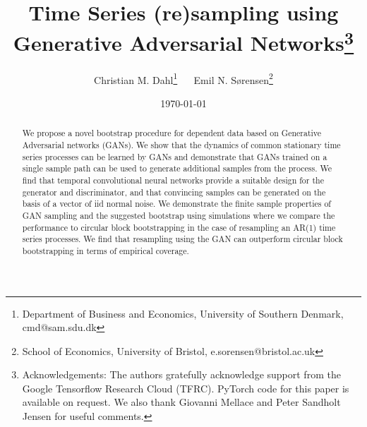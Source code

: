\documentclass[12pt]{article}
\begin{document}
\begin{titlepage}
\title{Time Series (re)sampling using Generative Adversarial Networks\footnote{Acknowledgements: The authors gratefully acknowledge support from the Google Tensorflow Research Cloud (TFRC). PyTorch code for this paper is available on request. We also thank Giovanni Mellace and Peter Sandholt Jensen for useful comments.}}
\author{Christian M. Dahl\footnote{Department of Business and Economics, University of Southern Denmark, cmd@sam.sdu.dk} $\quad$ Emil N. Sørensen\footnote{School of Economics, University of Bristol, e.sorensen@bristol.ac.uk}}
\date{\today}
\maketitle
\begin{abstract}
\noindent We propose a novel bootstrap procedure for dependent data based on Generative Adversarial networks (GANs). We show that the dynamics of common stationary time series processes can be learned by GANs and demonstrate that GANs trained on a single sample path can be used to generate additional samples from the process. We find that temporal convolutional neural networks provide a suitable design for the generator and discriminator, and that convincing samples can be generated on the basis of a vector of iid normal noise. We demonstrate the finite sample properties of GAN sampling and the suggested bootstrap using simulations where we compare the performance to circular block bootstrapping in the case of resampling an AR(1) time series processes. We find that resampling using the GAN can outperform circular block bootstrapping in terms of empirical coverage.

\bigskip
\end{abstract}
\thispagestyle{empty}
\end{titlepage}
\pagebreak \newpage


\doublespacing
\end{document}
